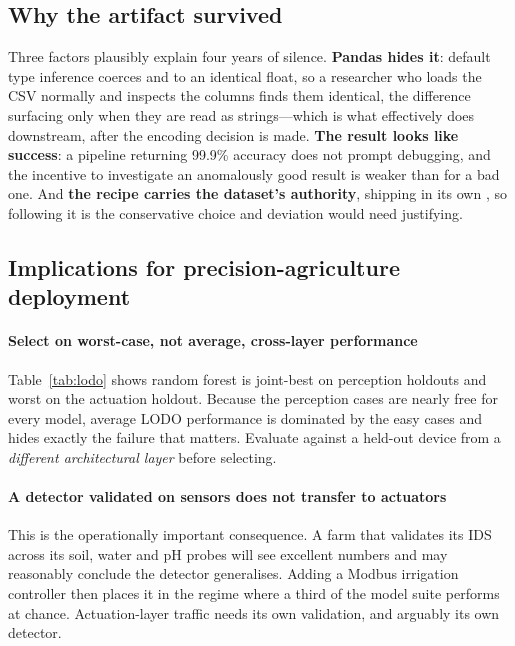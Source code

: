 \subsection{Why the artifact survived}

Three factors plausibly explain four years of silence. \textbf{Pandas hides
it}: default type inference coerces  and  to an identical
float, so a researcher who loads the CSV normally and inspects the columns
finds them identical, the difference surfacing only when they are read as
strings---which is what  effectively does downstream, after
the encoding decision is made. \textbf{The result looks like success}: a
pipeline returning 99.9\% accuracy does not prompt debugging, and the incentive
to investigate an anomalously good result is weaker than for a bad one. And
\textbf{the recipe carries the dataset's authority}, shipping in its own
, so following it is the conservative choice and deviation
would need justifying.

\subsection{Implications for precision-agriculture deployment}

\paragraph{Select on worst-case, not average, cross-layer performance}
Table~\ref{tab:lodo} shows random forest is joint-best on perception holdouts
and worst on the actuation holdout. Because the perception cases are nearly
free for every model, average LODO performance is dominated by the easy cases
and hides exactly the failure that matters. Evaluate against a held-out device
from a \emph{different architectural layer} before selecting.

\paragraph{A detector validated on sensors does not transfer to actuators} This
is the operationally important consequence. A farm that validates its IDS
across its soil, water and pH probes will see excellent numbers and may
reasonably conclude the detector generalises. Adding a Modbus irrigation
controller then places it in the regime where a third of the model suite
performs at chance. Actuation-layer traffic needs its own validation, and arguably
its own detector.

